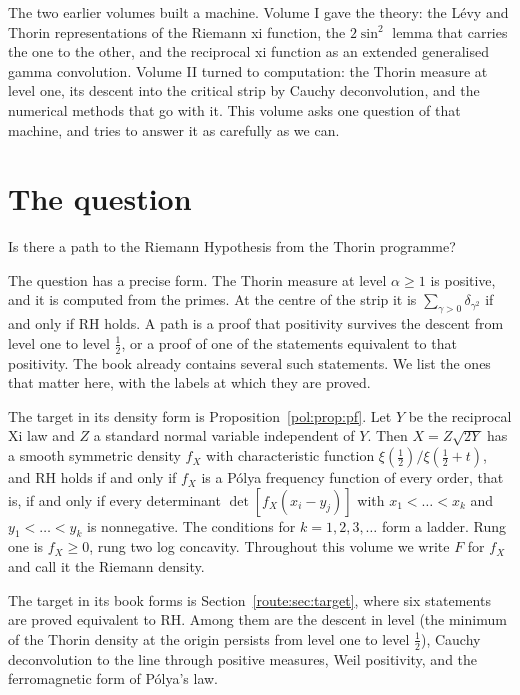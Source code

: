 \label{v3:ch:intro}
The two earlier volumes built a machine. Volume I gave the theory: the L\'evy and Thorin representations of the Riemann xi function, the $2\sin^2$ lemma that carries the one to the other, and the reciprocal xi function as an extended generalised gamma convolution. Volume II turned to computation: the Thorin measure at level one, its descent into the critical strip by Cauchy deconvolution, and the numerical methods that go with it. This volume asks one question of that machine, and tries to answer it as carefully as we can.

\section{The question}\label{v3:sec:question}

Is there a path to the Riemann Hypothesis from the Thorin programme?

The question has a precise form. The Thorin measure at level $\alpha\ge1$ is positive, and it is computed from the primes. At the centre of the strip it is $\sum_{\gamma>0}\delta_{\gamma^2}$ if and only if RH holds. A path is a proof that positivity survives the descent from level one to level $\frac12$, or a proof of one of the statements equivalent to that positivity. The book already contains several such statements. We list the ones that matter here, with the labels at which they are proved.

The target in its density form is Proposition~\ref{pol:prop:pf}. Let $Y$ be the reciprocal Xi law and $Z$ a standard normal variable independent of $Y$. Then $X=Z\sqrt{2Y}$ has a smooth symmetric density $f_X$ with characteristic function $\xi(\frac12)/\xi(\frac12+t)$, and RH holds if and only if $f_X$ is a P\'olya frequency function of every order, that is, if and only if every determinant $\det[f_X(x_i-y_j)]$ with $x_1<\dots<x_k$ and $y_1<\dots<y_k$ is nonnegative. The conditions for $k=1,2,3,\dots$ form a ladder. Rung one is $f_X\ge0$, rung two log concavity. Throughout this volume we write $F$ for $f_X$ and call it the Riemann density.

The target in its book forms is Section~\ref{route:sec:target}, where six statements are proved equivalent to RH. Among them are the descent in level (the minimum of the Thorin density at the origin persists from level one to level $\frac12$), Cauchy deconvolution to the line through positive measures, Weil positivity, and the ferromagnetic form of P\'olya's law.

